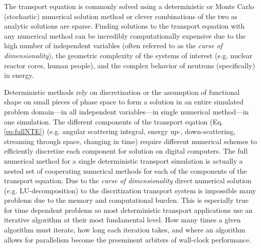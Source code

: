 The transport equation is commonly solved using a deterministic or Monte Carlo (stochastic) \cite{lux_1998} numerical solution method or clever combinations of the two \cite{monke_phd, pasmann_phd} as analytic solutions are sparse.
Finding solutions to the transport equation with any numerical method can be incredibly computationally expensive due to the high number of independent variables (often referred to as the \textit{curse of dimensionality}), the geometric complexity of the systems of interest (e.g. nuclear reactor cores, human people), and the complex behavior of neutrons (specifically) in energy.

Deterministic methods rely on discretization or the assumption of functional shape on small pieces of phase space to form a solution in an entire simulated problem domain---in all independent variables---in single numerical method---in one simulation.
The different components of the transport eqation (Eq. \eqref{eq:fullNTE}) (e.g. angular scattering integral, energy up-, down-scattering, streaming through space, changing in time) require different numerical schemes to efficiently discretize each component for solution on digital computers.
The full numerical method for a single deterministic transport simulation is actually a nested set of cooperating numerical methods for each of the components of the transport equation.
Due to the \textit{curse of dimensionality} direct numerical solution (e.g. LU-decomposition) to the discritization transport system is impossible many problems due to the memory and computational burden.
This is especially true for time dependent problems so most deterministic transport applications use an iterative algorithm at their most fundamental level.
How many times a given algorithm must iterate, how long each iteration takes, and where an algorithm allows for parallelism become the preeminent arbiters of wall-clock performance.

